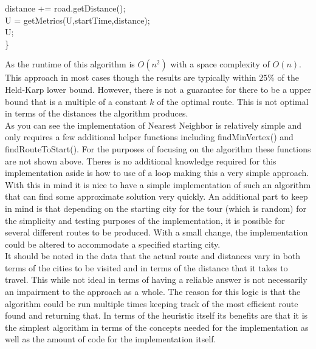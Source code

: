 \documentclass[midd]{thesis}
\newcommand{\tab}{\hspace*{2em}}
\begin{document}
\begin{codebox}
\tab distance += road.getDistance();\\
\tab U = getMetrics(U,startTime,distance);\\
\tab \Return U;\\
\}
\end{codebox}
As the runtime of this algorithm is $O(n^2)$\cite{htspc} with a space complexity of $O(n)$. This approach in most cases though the results are typically within $25\%$ of the Held-Karp lower bound\cite{htspc}. However, there is not a guarantee for there to be a upper bound that is a multiple of a constant $k$ of the optimal route. This is not optimal in terms of the distances the algorithm produces.\\
\tab As you can see the implementation of Nearest Neighbor is relatively simple and only requires a few additional helper functions including findMinVertex() and\\ findRouteToStart(). For the purposes of focusing on the algorithm these functions are not shown above. Theres is no additional knowledge required for this implementation aside is how to use of a loop making this a very simple approach. With this in mind it is nice to have a simple implementation of such an algorithm that can find some approximate solution very quickly. An additional part to keep in mind is that depending on the starting city for the tour (which is random) for the simplicity and testing purposes of the implementation, it is possible for several different routes to be produced. With a small change, the implementation could be altered to accommodate a specified starting city. \\
\tab It should be noted in the data that the actual route and distances vary in both terms of the cities to be visited and in terms of the distance that it takes to travel. This while not ideal in terms of having a reliable answer is not necessarily an impairment to the approach as a whole. The reason for this logic is that the algorithm could be run multiple times keeping track of the most efficient route found and returning that. In terms of the heuristic itself its benefits are that it is the simplest algorithm in terms of the concepts needed for the implementation as well as the amount of code for the implementation itself.
\end{document}

